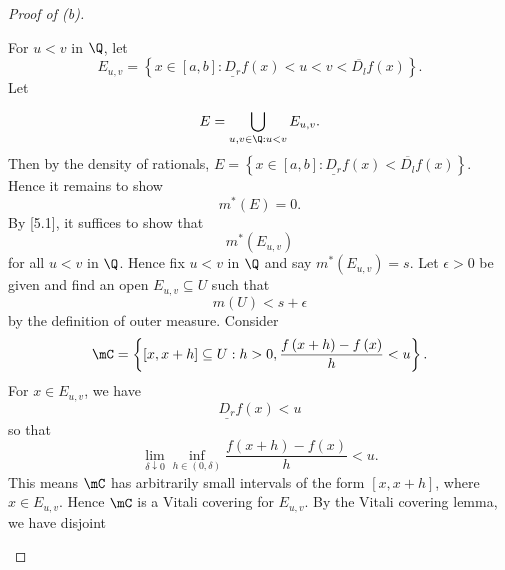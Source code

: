 \documentclass[pmath451]{subfiles}
\begin{document}
\begin{proof}[Proof of (b)]
\begin{claim}
            For $u<v$ in $\Q$, let
            \begin{equation*}
                E_{u,v} = \left\lbrace x\in \left[ a,b \right] : \underline{D_r}f\left( x \right) < u < v < \overline{D_l}f\left( x \right) \right\rbrace.
            \end{equation*}
            Let
            \begin{equation}
                E = \bigcup^{}_{u,v\in\Q : u<v} E_{u,v}.
            \end{equation}
            Then by the density of rationals, $E = \left\lbrace x\in\left[ a,b \right]: \underline{D_r}f\left( x \right)<\overline{D_l}f\left( x \right) \right\rbrace$. Hence it remains to show
            \begin{equation*}
                m^{*}\left( E \right) = 0.
            \end{equation*}
            By [5.1], it suffices to show that
            \begin{equation*}
                m^{*}\left( E_{u,v} \right)
            \end{equation*}
            for all $u<v$ in $\Q$. Hence fix $u<v$ in $\Q$ and say $m^{*}\left( E_{u,v} \right)=s$. Let $\epsilon>0$ be given and find an open $E_{u,v}\subseteq U$ such that
            \begin{equation*}
                m\left( U \right) < s+\epsilon
            \end{equation*}
            by the definition of outer measure. Consider
            \begin{equation*}
                \mC = \left\lbrace \left[ x,x+h \right]\subseteq U: h>0, \frac{f\left( x+h \right)-f\left( x \right)}{h}<u \right\rbrace.
            \end{equation*}
            For $x\in E_{u,v}$, we have
            \begin{equation*}
                \underline{D_r}f\left( x \right) < u
            \end{equation*}
            so that
            \begin{equation*}
                \lim_{\delta\downarrow 0}\inf_{h\in\left( 0,\delta \right)} \frac{f\left( x+h \right)-f\left( x \right)}{h} < u.
            \end{equation*}
            This means $\mC$ has arbitrarily small intervals of the form $\left[ x,x+h \right]$, where $x\in E_{u,v}$. Hence $\mC$ is a Vitali covering for $E_{u,v}$. By the Vitali covering lemma, we have disjoint
            \begin{equation*}

\end{equation*}
\end{claim}
\end{proof}
\end{document}
